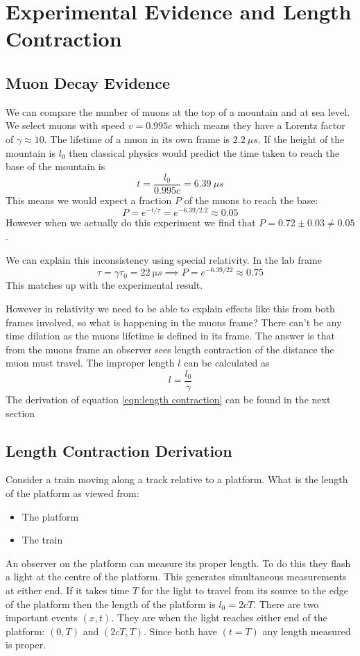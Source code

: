 \documentclass{article}
\begin{document}
    \section{Experimental Evidence and Length Contraction}
    \subsection{Muon Decay Evidence}
    We can compare the number of muons at the top of a mountain and at sea level. 
    We select muons with speed \(v = 0.995c\) which means they have a Lorentz factor of \(\gamma \approx 10\). 
    The lifetime of a muon in its own frame is \(\SI{2.2}{\mu s}\). 
    If the height of the mountain is \(l_0\) then classical physics would predict the time taken to reach the base of the mountain is 
    \[t = \frac{l_0}{0.995c} = \SI{6.39}{\mu s}\]
    This means we would expect a fraction \(P\) of the muons to reach the base:
    \[P = e^{-t/\tau} = e^{-6.39/2.2}\approx 0.05\]
    However when we actually do this experiment we find that \(P = 0.72\pm 0.03\ne 0.05\).
    
    We can explain this inconsistency using special relativity.
    In the lab frame 
    \[\tau = \gamma\tau_0 = \SI{22}{\micro s}\implies P = e^{-6.39/22}\approx 0.75\]
    This matches up with the experimental result.
    
    However in relativity we need to be able to explain effects like this from both frames involved, so what is happening in the muons frame? 
    There can't be any time dilation as the muons lifetime is defined in its frame.
    The answer is that from the muons frame an observer sees length contraction of the distance the muon must travel.
    The improper length \(l\) can be calculated as
    \begin{equation}\label{eqn:length contraction}
        l = \frac{l_0}{\gamma}
    \end{equation}
    The derivation of equation \ref{eqn:length contraction} can be found in the next section
    
    \subsection{Length Contraction Derivation}
    Consider a train moving along a track relative to a platform. What is the length of the platform as viewed from:
    \begin{itemize}
        \item The platform
        \item The train
    \end{itemize}
    An observer on the platform can measure its proper length. 
    To do this they flash a light at the centre of the platform. 
    This generates simultaneous measurements at either end. 
    If it takes time \(T\) for the light to travel from its source to the edge of the platform then the length of the platform is \(l_0 = 2cT\). 
    There are two important events \((x, t)\).
    They are when the light reaches either end of the platform: \((0, T)\) and \((2cT, T)\). Since both have \((t = T)\) any length measured is proper.
    
\end{document}

